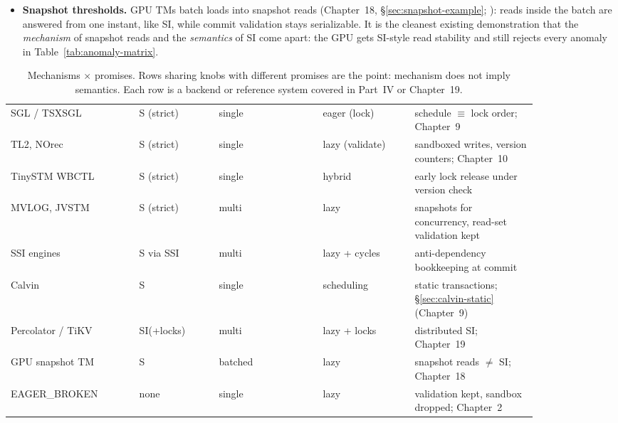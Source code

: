 \begin{itemize}
\item \textbf{Snapshot thresholds.} GPU TMs batch loads into snapshot reads
(Chapter~18, \S\ref{sec:snapshot-example}; \cite{chen17snapshot}): reads
inside the batch are answered from one instant, like SI, while commit
validation stays serializable. It is the cleanest existing demonstration
that the \emph{mechanism} of snapshot reads and the \emph{semantics} of SI
come apart: the GPU gets SI-style read stability and still rejects every
anomaly in Table~\ref{tab:anomaly-matrix}.
\end{itemize}

\begin{table}[htbp]
\centering
\small
\begin{tabular}{M{0.21\linewidth}M{0.13\linewidth}M{0.17\linewidth}M{0.15\linewidth}M{0.20\linewidth}}
\hline
{} &  &  &  &  \\
\hline
SGL / TSXSGL & S (strict) & single & eager (lock) & schedule $\equiv$ lock order; Chapter~9 \\
TL2, NOrec & S (strict) & single & lazy (validate) & sandboxed writes, version counters; Chapter~10 \\
TinySTM WBCTL & S (strict) & single & hybrid & early lock release under version check \\
MVLOG, JVSTM & S (strict) & multi & lazy & snapshots for concurrency, read-set validation kept \\
SSI engines & S via SSI & multi & lazy + cycles & anti-dependency bookkeeping at commit \\
Calvin & S & single & scheduling & static transactions; \S\ref{sec:calvin-static} (Chapter~9) \\
Percolator / TiKV & SI(+locks) & multi & lazy + locks & distributed SI; Chapter~19 \\
GPU snapshot TM & S & batched & lazy & snapshot reads $\ne$ SI; Chapter~18 \\
EAGER\_BROKEN & none & single & lazy & validation kept, sandbox dropped; Chapter~2 \\
\hline
\end{tabular}
\caption{Mechanisms $\times$ promises. Rows sharing knobs with different
promises are the point: mechanism does not imply semantics. Each row is a
backend or reference system covered in Part~IV or Chapter~19.}
\label{tab:sem-mech}
\end{table}

